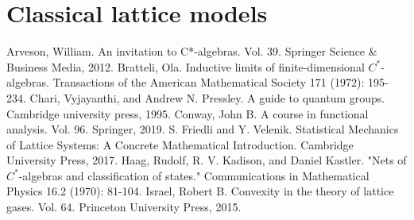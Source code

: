 \documentclass[11pt]{article}%
\theoremstyle{definition}
\theoremstyle{definition}
\theoremstyle{definition}\newtheorem{definition}{Definition}
\theoremstyle{definition} \newtheorem{cntex}{Counterexample}
\theoremstyle{definition}\newtheorem*{acknowledgement}{Acknowledgement}
\theoremstyle{definition}\newtheorem{remark}{Remark}
\theoremstyle{definition}\newtheorem{quest}{Question}
\numberwithin{equation}{section}
\begin{document}
\tableofcontents


\section{Classical lattice models}







\begin{thebibliography}{10}
 Arveson, William. An invitation to C*-algebras. Vol. 39. Springer Science \& Business Media, 2012.
 Bratteli, Ola. Inductive limits of finite-dimensional $C^*$-algebras. Transactions of the American Mathematical Society 171 (1972): 195-234.\label{bratteli}
 Chari, Vyjayanthi, and Andrew N. Pressley. A guide to quantum groups. Cambridge university press, 1995.
 Conway, John B. A course in functional analysis. Vol. 96. Springer, 2019.
 S. Friedli and Y. Velenik. Statistical Mechanics of Lattice Systems: A Concrete Mathematical Introduction. Cambridge University Press, 2017.
 Haag, Rudolf, R. V. Kadison, and Daniel Kastler. "Nets of $C^*$-algebras and classification of states." Communications in Mathematical Physics 16.2 (1970): 81-104.
 Israel, Robert B. Convexity in the theory of lattice gases. Vol. 64. Princeton University Press, 2015.
\end{thebibliography}
\end{document}
